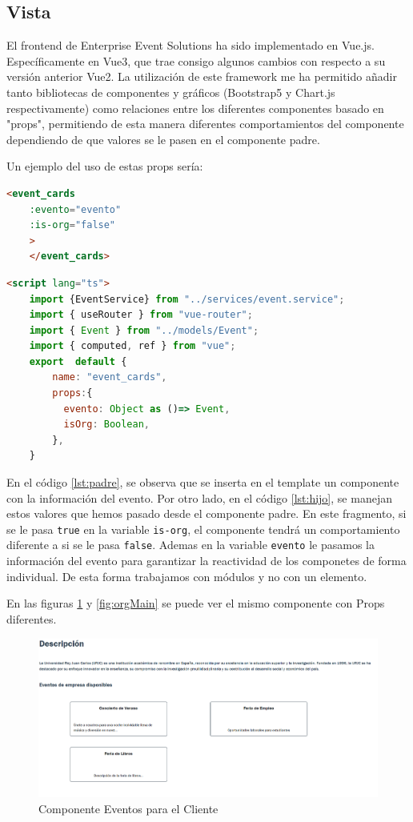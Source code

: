 \subsection{Vista}
El frontend de Enterprise Event Solutions ha sido implementado en Vue.js. Específicamente en Vue3, que trae consigo algunos cambios con respecto a su versión
anterior Vue2. La utilización de este framework me ha permitido añadir tanto bibliotecas de componentes y gráficos (Bootstrap5 y Chart.js respectivamente)
como relaciones entre los diferentes componentes basado en "props", permitiendo de esta manera diferentes comportamientos del componente dependiendo de
que valores se le pasen en el componente padre.

Un ejemplo del uso de estas props sería:
\myvuestyle
\begin{lstlisting}[language=HTML, caption=Ejemplo del Padre, label=lst:padre]
    <event_cards
    :evento="evento"
    :is-org="false"
    >
    </event_cards>
\end{lstlisting}
\myvuestyle
\begin{lstlisting}[language=HTML, caption=Ejemplo del Hijo, label=lst:hijo]
    <script lang="ts">
    import {EventService} from "../services/event.service";
    import { useRouter } from "vue-router";
    import { Event } from "../models/Event";
    import { computed, ref } from "vue";
    export  default {
        name: "event_cards",
        props:{
          evento: Object as ()=> Event,
          isOrg: Boolean,
        },
    }
\end{lstlisting}

En el código \ref{lst:padre}, se observa que se inserta en el template un componente con la información del evento. Por otro lado, en el código 
\ref{lst:hijo}, se manejan estos valores que hemos pasado desde el componente padre. En este fragmento, si se le pasa \texttt{true} en la variable 
\texttt{is-org}, el componente tendrá un comportamiento diferente a si se le pasa \texttt{false}. Ademas en la variable \texttt{evento} le pasamos la información
del evento para garantizar la reactividad de los componetes de forma individual. De esta forma trabajamos con módulos y no con un elemento.

\newpage
En las figuras \ref{fig:eventosCli} y \ref{fig:orgMain}  se puede ver el mismo componente con Props diferentes.
\begin{figure}[h]
    \centering
    \includegraphics[width=1\textwidth]{eventosCli.png} 
    \caption{Componente Eventos para el Cliente}
    \label{fig:eventosCli}
\end{figure}


